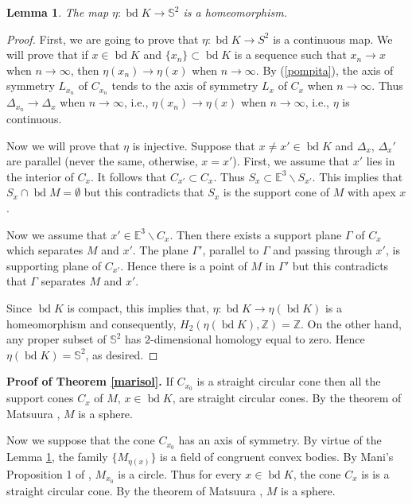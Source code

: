 \documentclass[12pt]{amsart}
\newcommand{\bd}{\operatorname*{bd}}
\newtheorem{lemma}{Lemma}
\begin{document}
\begin{lemma}\label{homeo}
The  map $\eta: \bd K\to \mathbb S^2$ is a homeomorphism.
\end{lemma}
\begin{proof} 
First, we are going to prove that $\eta: \bd K\to S^2$ is a continuous map. 
We will prove that if $x\in \bd K$ and $\{x_n\}\subset \bd K$ is a sequence such that $x_n\rightarrow x$ when $n \rightarrow \infty$, then $\eta(x_n)\rightarrow \eta(x)$ when $n \rightarrow \infty$. By (\ref{pompita}), the axis of symmetry $L_{x_n}$ of $C_{x_n}$ tends to the axis of symmetry $L_x$ of $C_{x}$ when $n \rightarrow \infty$. Thus  
$\Delta_{x_n}\rightarrow \Delta_x$ when $n \rightarrow \infty$, i.e., $\eta(x_n)\rightarrow \eta(x)$ when $n \rightarrow \infty$, i.e., $\eta$ is continuous.

   
Now we will prove that $\eta$ is injective. Suppose that $x\not=x' \in \bd K$ and $\Delta_x$, $\Delta_x'$ are parallel (never the same, otherwise, $x=x'$). First, we assume that $x'$ lies in the interior of $C_x$. It follows that $C_{x'}\subset C_x$. Thus $S_x\subset \mathbb{E}^3 \backslash S_{x'}$. This implies that $S_x\cap \bd M=\emptyset$  but this contradicts that $S_x$ is the support cone of $M$ with apex $x$. 
 
Now we assume that $x'\in \mathbb{E}^3 \backslash C_x$. Then there exists a support plane $\Gamma$ of $C_x$ which separates $M$ and 
$x'$. The plane $\Gamma'$, parallel to $\Gamma$ and passing through $x'$, is supporting plane of $C_{x'}$. Hence there is a point of $M$ in $\Gamma'$ but this contradicts that $\Gamma$ separates $M$ and 
$x'$.

Since $\bd K$ is compact, this implies that,  
  $\eta: \bd K\to \eta(\bd K)$  is a homeomorphism and consequently, $H_{2}(\eta(\bd K), \mathbb Z)=\mathbb Z$. On the other hand, any proper subset of $ \mathbb S^2$ has $2$-dimensional homology equal to zero. Hence  $\eta(\bd K)= \mathbb S^2$, as desired.
\end{proof}

\textbf{Proof of Theorem \ref{marisol}.} If $C_{x_0}$ is a straight circular cone then all the support cones $C_x$ of $M$, $x\in \bd K$, are straight circular cones. By the theorem of Matsuura \cite{Matsuura}, $M$ is a sphere.

Now we suppose that the cone $C_{x_0}$ has an axis of symmetry.
By virtue of the Lemma \ref{homeo}, the family $\{M_{\eta(x)}\}$ is a field of congruent convex bodies. By Mani's  Proposition 1 of \cite{mani}, $M_{x_{0}}$ is a circle. Thus for every $x\in \bd K$, the cone $C_x$ is 
is a straight circular cone. By the theorem of Matsuura \cite{Matsuura}, $M$ is a sphere.
\end{document}
